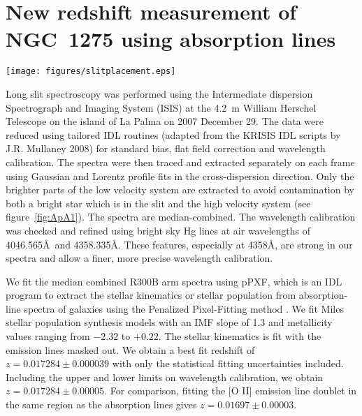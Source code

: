 \section{New redshift measurement of NGC~1275 using absorption lines}
\label{sec:redshift}

\begin{figure*}
\begin{center}
\texttt{[image: figures/slitplacement.eps]}
\end{center}
\caption{The slit placement on NGC~1275. Our spectral extraction region is indicated with the cyan box on the red slit. Only the brighter parts of the low velocity system are extracted to avoid contamination by both a bright star and the high velocity system.}
\label{fig:ApA1}
\end{figure*}

Long slit spectroscopy was performed using the Intermediate dispersion Spectrograph and Imaging System (ISIS) at the 4.2~m William Herschel Telescope on the island of La Palma on 2007 December 29. The data were reduced using tailored IDL routines (adapted from the KRISIS IDL scripts by J.R. Mullaney 2008) for standard bias, flat field correction and wavelength calibration. The spectra were then traced and extracted separately on each frame using Gaussian and Lorentz profile fits in the cross-dispersion direction. Only the brighter parts of the low velocity system are extracted to avoid contamination by both a bright star which is in the slit and the high velocity system (see figure~\ref{fig:ApA1}). The spectra are median-combined. The wavelength calibration was checked and refined using bright sky Hg lines at air wavelengths of 4046.565\AA\ and 4358.335\AA. These features, especially at 4358\AA, are strong in our spectra and allow a finer, more precise wavelength calibration.

We fit the median combined R300B arm spectra using pPXF, which is an IDL program to extract the stellar kinematics or stellar population from absorption-line spectra of galaxies using the Penalized Pixel-Fitting method \citep[pPXF;][]{Cappellari04,cappellari17}. We fit Miles stellar population synthesis models with an IMF slope of 1.3 and metallicity values ranging from $-2.32$ to $+0.22$. The stellar kinematics is fit with the emission lines masked out. We obtain a best fit redshift of $z=0.017284\pm0.000039$ with only the statistical fitting uncertainties included. Including the upper and lower limits on wavelength calibration, we obtain $z=0.017284\pm0.00005$. For comparison, fitting the [O II] emission line doublet in the same region as the absorption lines gives $z=0.01697\pm0.00003$.
